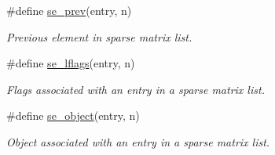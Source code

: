 \begin{CompactItemize}
\#define \hyperlink{group__dbprim__smat_a44}{se\_\-prev}(entry, n)
\begin{CompactList}\small\item\em Previous element in sparse matrix list. \item\end{CompactList}\item 
\#define \hyperlink{group__dbprim__smat_a45}{se\_\-lflags}(entry, n)
\begin{CompactList}\small\item\em Flags associated with an entry in a sparse matrix list. \item\end{CompactList}\item 
\#define \hyperlink{group__dbprim__smat_a46}{se\_\-object}(entry, n)
\begin{CompactList}\small\item\em Object associated with an entry in a sparse matrix list. \item\end{CompactList}\end{CompactItemize}
